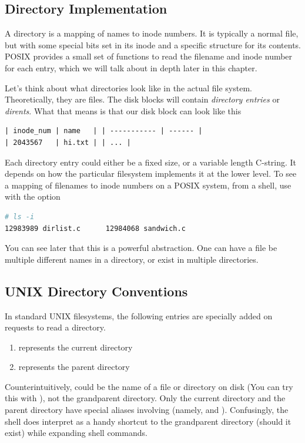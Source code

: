 \subsection{Directory Implementation}

A directory is a mapping of names to inode numbers.
It is typically a normal file, but with some special bits set in its inode and a specific structure for its contents.
POSIX provides a small set of functions to read the filename and inode number for each entry, which we will talk about in depth later in this chapter.

Let's think about what directories look like in the actual file system.
Theoretically, they are files.
The disk blocks will contain \emph{directory entries} or \emph{dirents}.
What that means is that our disk block can look like this

\begin{verbatim}
| inode_num | name   | | ----------- | ------ |
| 2043567   | hi.txt | | ... |
\end{verbatim}

Each directory entry could either be a fixed size, or a variable length C-string.
It depends on how the particular filesystem implements it at the lower level.
To see a mapping of filenames to inode numbers on a POSIX system, from a shell, use  with the  option

\begin{lstlisting}[language=bash]
# ls -i
12983989 dirlist.c      12984068 sandwich.c
\end{lstlisting}

You can see later that this is a powerful abstraction.
One can have a file be multiple different names in a directory, or exist in multiple directories.

\subsection{UNIX Directory Conventions}

In standard UNIX filesystems, the following entries are specially added on requests to read a directory.

\begin{enumerate}
  \item {} represents the current directory
  \item {} represents the parent directory
\end{enumerate}

Counterintuitively,  could be the name of a file or directory on disk (You can try this with ), not the grandparent directory.
Only the current directory and the parent directory have special aliases involving  (namely,  and ).
Confusingly, the shell  does interpret  as a handy shortcut to the grandparent directory (should it exist) while expanding shell commands.

